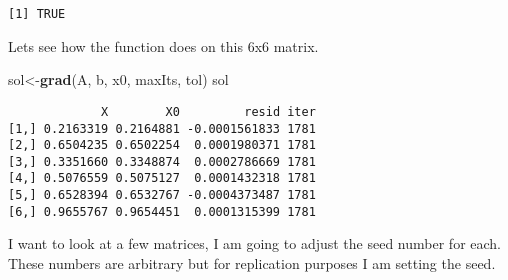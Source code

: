 \documentclass[]{article}
\newenvironment{Shaded}{\begin{snugshade}}{\end{snugshade}}
\newcommand{\KeywordTok}[1]{\textcolor[rgb]{0.13,0.29,0.53}{\textbf{#1}}}
\newcommand{\DataTypeTok}[1]{\textcolor[rgb]{0.13,0.29,0.53}{#1}}
\newcommand{\DecValTok}[1]{\textcolor[rgb]{0.00,0.00,0.81}{#1}}
\newcommand{\FloatTok}[1]{\textcolor[rgb]{0.00,0.00,0.81}{#1}}
\newcommand{\StringTok}[1]{\textcolor[rgb]{0.31,0.60,0.02}{#1}}
\newcommand{\CommentTok}[1]{\textcolor[rgb]{0.56,0.35,0.01}{\textit{#1}}}
\newcommand{\OperatorTok}[1]{\textcolor[rgb]{0.81,0.36,0.00}{\textbf{#1}}}
\newcommand{\NormalTok}[1]{#1}
\begin{document}
\begin{verbatim}
[1] TRUE
\end{verbatim}

Lets see how the function does on this 6x6 matrix.

\begin{Shaded}
\begin{Highlighting}[]
\NormalTok{sol<-}\KeywordTok{grad}\NormalTok{(A, b, x0, maxIts, tol)}
\NormalTok{sol}
\end{Highlighting}
\end{Shaded}

\begin{verbatim}
             X        X0         resid iter
[1,] 0.2163319 0.2164881 -0.0001561833 1781
[2,] 0.6504235 0.6502254  0.0001980371 1781
[3,] 0.3351660 0.3348874  0.0002786669 1781
[4,] 0.5076559 0.5075127  0.0001432318 1781
[5,] 0.6528394 0.6532767 -0.0004373487 1781
[6,] 0.9655767 0.9654451  0.0001315399 1781
\end{verbatim}

I want to look at a few matrices, I am going to adjust the seed number
for each. These numbers are arbitrary but for replication purposes I am
setting the seed.

\begin{Shaded}
\end{Shaded}
\end{document}
